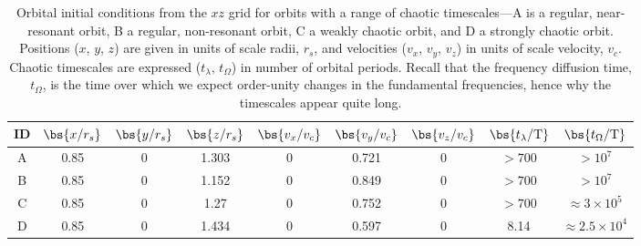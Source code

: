 \begin{table}[ht]
\begin{center}
	\begin{tabular}{c | c c c c c c | c c}
		{\bf ID} & $\bs{x/r_s}$ & $\bs{y/r_s}$ & $\bs{z/r_s}$ & $\bs{v_x/v_c}$ & $\bs{v_y/v_c}$ & $\bs{v_z/v_c}$ & $\bs{t_\lambda/\periods}$ & $\bs{t_\Omega/\periods}$ \\\toprule
A & 0.85 & 0 & 1.303 & 0 & 0.721 & 0 & $>700$ & $>10^7$ \\
\midrule
B & 0.85 & 0 & 1.152 & 0 & 0.849 & 0 & $>700$ & $>10^7$\\
\midrule
C & 0.85 & 0 & 1.27 & 0 & 0.752 & 0 & $>700$ & $\approx 3\times10^5$\\
\midrule
D & 0.85 & 0 & 1.434 & 0 & 0.597 & 0 & 8.14 & $\approx 2.5\times10^4$\\
		\bottomrule
		\end{tabular}
	\caption{Orbital initial conditions from the $xz$ grid for orbits with a range of chaotic timescales---A is a regular, near-resonant orbit, B a regular, non-resonant orbit, C a weakly chaotic orbit, and D a strongly chaotic orbit. Positions ($x$, $y$, $z$) are given in units of scale radii, $r_s$, and velocities ($v_x$, $v_y$, $v_z$) in units of scale velocity, $v_c$. Chaotic timescales are expressed ($t_\lambda$, $t_\Omega$) in number of orbital periods. Recall that the frequency diffusion time, $t_\Omega$, is the time over which we expect order-unity changes in the fundamental frequencies, hence why the timescales appear quite long. \label{tbl:orbit-info}}
\end{center}
\end{table}

